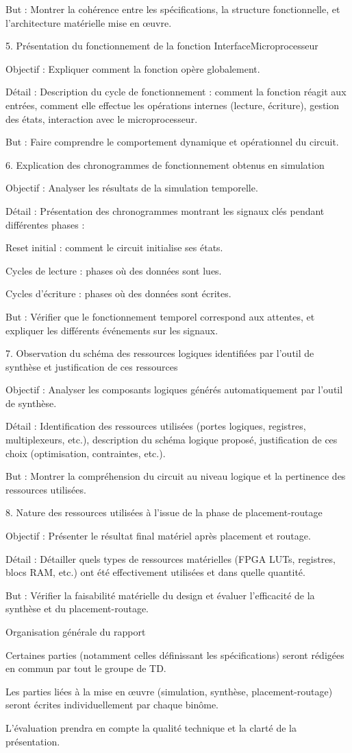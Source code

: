 But : Montrer la cohérence entre les spécifications, la structure fonctionnelle, et l’architecture matérielle mise en œuvre.

5. Présentation du fonctionnement de la fonction InterfaceMicroprocesseur

Objectif : Expliquer comment la fonction opère globalement.

Détail : Description du cycle de fonctionnement : comment la fonction réagit aux entrées, comment elle effectue les opérations internes (lecture, écriture), gestion des états, interaction avec le microprocesseur.

But : Faire comprendre le comportement dynamique et opérationnel du circuit.

6. Explication des chronogrammes de fonctionnement obtenus en simulation

Objectif : Analyser les résultats de la simulation temporelle.

Détail : Présentation des chronogrammes montrant les signaux clés pendant différentes phases :

Reset initial : comment le circuit initialise ses états.

Cycles de lecture : phases où des données sont lues.

Cycles d’écriture : phases où des données sont écrites.

But : Vérifier que le fonctionnement temporel correspond aux attentes, et expliquer les différents événements sur les signaux.

7. Observation du schéma des ressources logiques identifiées par l’outil de synthèse et justification de ces ressources

Objectif : Analyser les composants logiques générés automatiquement par l’outil de synthèse.

Détail : Identification des ressources utilisées (portes logiques, registres, multiplexeurs, etc.), description du schéma logique proposé, justification de ces choix (optimisation, contraintes, etc.).

But : Montrer la compréhension du circuit au niveau logique et la pertinence des ressources utilisées.

8. Nature des ressources utilisées à l’issue de la phase de placement-routage

Objectif : Présenter le résultat final matériel après placement et routage.

Détail : Détailler quels types de ressources matérielles (FPGA LUTs, registres, blocs RAM, etc.) ont été effectivement utilisées et dans quelle quantité.

But : Vérifier la faisabilité matérielle du design et évaluer l’efficacité de la synthèse et du placement-routage.

Organisation générale du rapport

Certaines parties (notamment celles définissant les spécifications) seront rédigées en commun par tout le groupe de TD.

Les parties liées à la mise en œuvre (simulation, synthèse, placement-routage) seront écrites individuellement par chaque binôme.

L’évaluation prendra en compte la qualité technique et la clarté de la présentation.